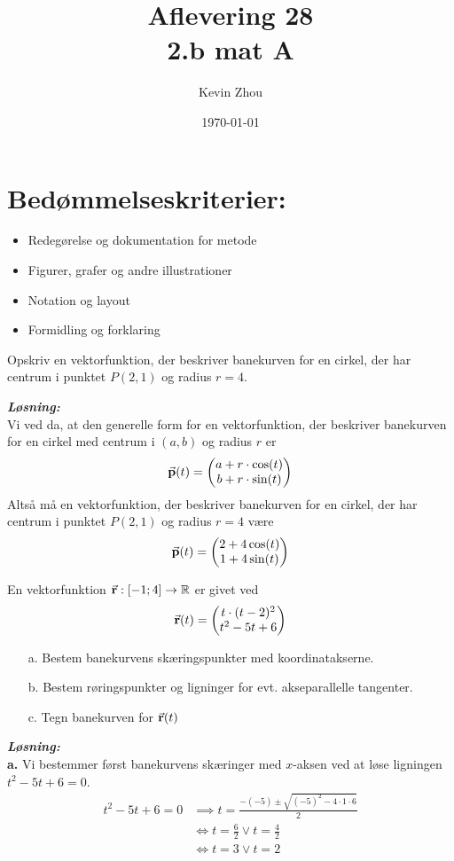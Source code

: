 \documentclass{article}
\title{Aflevering 28\\
{\Large \textbf{2.b mat A}}}
\author{Kevin Zhou}
\date{\today}
\newcommand{\sol}{\setlength{\parindent}{0cm}\textbf{\textit{Løsning:}}\setlength{\parindent}{1cm}}
\begin{document}
\maketitle
\section*{Bedømmelseskriterier:}
\begin{itemize}
    \setlength\itemsep{3cm}
    \Large
    \item  Redegørelse og dokumentation for metode
    \item Figurer, grafer og andre illustrationer
    \item Notation og layout
    \item Formidling og forklaring
\end{itemize}
\pagebreak
\begin{question}{}{}
  Opskriv en vektorfunktion, der beskriver banekurven for en cirkel, der har centrum i punktet $P(2,1)$ og radius $r=4$.
\end{question}
\sol \\
Vi ved da, at den generelle form for en vektorfunktion, der beskriver banekurven for en cirkel med centrum i $(a,b)$ og radius $r$ er 
\[
\va{p}(t) = \mqty(a+r \cdot \cos(t)\\ b+r \cdot \sin(t))  
\] 
Altså må en vektorfunktion, der beskriver banekurven for en cirkel, der har centrum i punktet $P(2,1)$ og radius $r=4$ være
\[
\va{p}(t) =\mqty(2+4\cos(t)\\ 1+4\sin(t)) 
\] 
\begin{question}{}{}
  En vektorfunktion $\va{r}:[-1;4]\to \mathbb{R}$ er givet ved
  \[
  \va{r}(t) =\mqty(t \cdot (t-2)^2\\ t^2-5t+6) 
  \] 
  \begin{itemize}
    \item[a.] Bestem banekurvens skæringspunkter med koordinatakserne.
    \item[b.] Bestem røringspunkter og ligninger for evt. akseparallelle tangenter.
    \item[c.] Tegn banekurven for $\va{r}(t)$
  \end{itemize}
\end{question}
\sol \\
\textbf{a.}
Vi bestemmer først banekurvens skæringer med $x$-aksen ved at løse ligningen $t^2-5t+6=0$.
\begin{equation*}
\begin{split}
t^2-5t+6=0 &\implies t=\frac{-(-5)\pm \sqrt{(-5)^2-4 \cdot 1 \cdot 6} }{2}\\ 
&\iff t=\frac{6}{2} \lor t=\frac{4}{2}\\ 
&\iff t=3 \lor t=2
\end{split}
\end{equation*}
\end{document}
